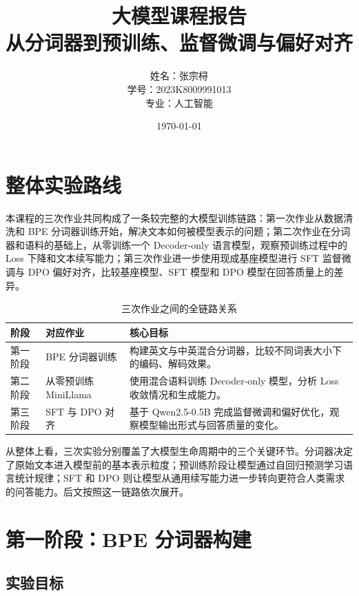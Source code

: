 \documentclass[a4paper,12pt]{ctexart}
\title{\textbf{大模型课程报告}\\从分词器到预训练、监督微调与偏好对齐}
\author{姓名：张宗桪 \\ 学号：2023K8009991013 \\ 专业：人工智能}
\date{\today}
\begin{document}
\pagestyle{plain}

\maketitle
\thispagestyle{empty}
\newpage

\tableofcontents
\newpage

\section{整体实验路线}

本课程的三次作业共同构成了一条较完整的大模型训练链路：第一次作业从数据清洗和 BPE 分词器训练开始，解决文本如何被模型表示的问题；第二次作业在分词器和语料的基础上，从零训练一个 Decoder-only 语言模型，观察预训练过程中的 Loss 下降和文本续写能力；第三次作业进一步使用现成基座模型进行 SFT 监督微调与 DPO 偏好对齐，比较基座模型、SFT 模型和 DPO 模型在回答质量上的差异。

\begin{table}[H]
    \centering
    \begin{tabularx}{\textwidth}{L{0.18\textwidth}L{0.25\textwidth}Y}
        \toprule
        阶段 & 对应作业 & 核心目标 \\
        \midrule
        第一阶段 & BPE 分词器训练 & 构建英文与中英混合分词器，比较不同词表大小下的编码、解码效果。 \\
        第二阶段 & 从零预训练 MiniLlama & 使用混合语料训练 Decoder-only 模型，分析 Loss 收敛情况和生成能力。 \\
        第三阶段 & SFT 与 DPO 对齐 & 基于 Qwen2.5-0.5B 完成监督微调和偏好优化，观察模型输出形式与回答质量的变化。 \\
        \bottomrule
    \end{tabularx}
    \caption{三次作业之间的全链路关系}
\end{table}

从整体上看，三次实验分别覆盖了大模型生命周期中的三个关键环节。分词器决定了原始文本进入模型前的基本表示粒度；预训练阶段让模型通过自回归预测学习语言统计规律；SFT 和 DPO 则让模型从通用续写能力进一步转向更符合人类需求的问答能力。后文按照这一链路依次展开。

\section{第一阶段：BPE 分词器构建}

\subsection{实验目标}
\end{document}
